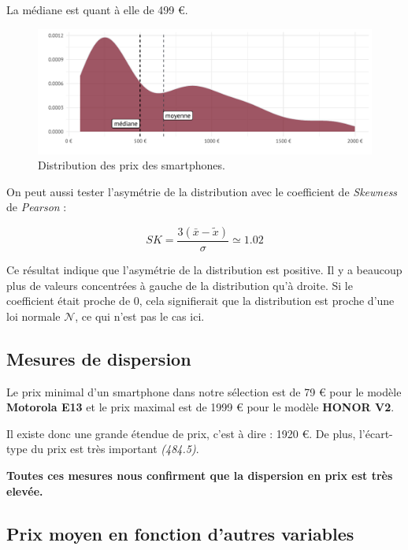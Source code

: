 \documentclass[
  12pt,
]{report}
\begin{document}
La médiane est quant à elle de 499 €.

\begin{figure}[H]

{\centering \includegraphics{report_files/figure-pdf/density_phones-1.pdf}

}

\caption{Distribution des prix des smartphones.}

\end{figure}%

On peut aussi tester l'asymétrie de la distribution avec le coefficient
de \emph{Skewness} de \emph{Pearson} :

\[SK = \dfrac{3(\bar{x} - \tilde{x})}{\sigma} \simeq 1.02\]

Ce résultat indique que l'asymétrie de la distribution est positive. Il
y a beaucoup plus de valeurs concentrées à gauche de la distribution
qu'à droite. Si le coefficient était proche de 0, cela signifierait que
la distribution est proche d'une loi normale \(\mathcal{N}\), ce qui
n'est pas le cas ici.

\subsection{Mesures de dispersion}\label{mesures-de-dispersion}

Le prix minimal d'un smartphone dans notre sélection est de 79 € pour le
modèle \textbf{Motorola E13} et le prix maximal est de 1999 € pour le
modèle \textbf{HONOR V2}.

Il existe donc une grande étendue de prix, c'est à dire : 1920 €. De
plus, l'écart-type du prix est très important \emph{(484.5)}.

\textbf{Toutes ces mesures nous confirment que la dispersion en prix est
très elevée.}

\subsection{Prix moyen en fonction d'autres
variables}\label{prix-moyen-en-fonction-dautres-variables}
\end{document}
